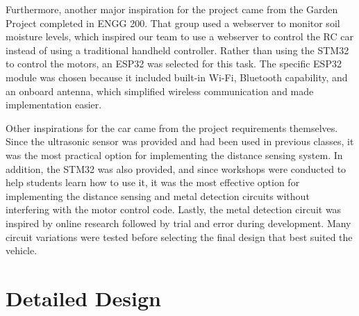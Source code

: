\documentclass[11pt]{article}
\begin{document}
Furthermore, another major inspiration for the project came from the Garden Project completed in ENGG 200. That group used a webserver to monitor soil moisture levels, which inspired our team to use a webserver to control the RC car instead of using a traditional handheld controller. Rather than using the STM32 to control the motors, an ESP32 was selected for this task. The specific ESP32 module was chosen because it included built-in Wi-Fi, Bluetooth capability, and an onboard antenna, which simplified wireless communication and made implementation easier.

Other inspirations for the car came from the project requirements themselves. Since the ultrasonic sensor was provided and had been used in previous classes, it was the most practical option for implementing the distance sensing system. In addition, the STM32 was also provided, and since workshops were conducted to help students learn how to use it, it was the most effective option for implementing the distance sensing and metal detection circuits without interfering with the motor control code. Lastly, the metal detection circuit was inspired by online research followed by trial and error during development. Many circuit variations were tested before selecting the final design that best suited the vehicle.

\newpage

\section{Detailed Design}
\end{document}
